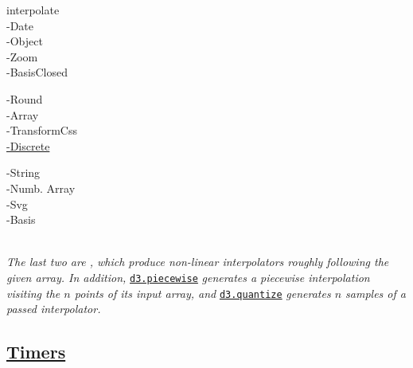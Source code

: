 {\footnotesize
\begin{minipage}[t]{2.0cm}
    interpolate\\
    -Date\\
    -Object\\
    -Zoom\\
    -BasisClosed
\end{minipage}
\begin{minipage}[t]{2.0cm}
    -Round\\
    -Array\\
    -TransformCss\\
    \href{https://observablehq.com/@d3/d3-interpolatediscrete}{-Discrete}
\end{minipage}
\begin{minipage}[t]{2.0cm}
    -String\\
    -Numb. Array\\
    -Svg\\
    -Basis
\end{minipage}
}\\
\textit{The last two are , which produce non-linear interpolators roughly following the given array. In addition, }\texttt{\href{https://observablehq.com/@d3/d3-piecewise}{d3.piecewise}}\textit{ generates a piecewise interpolation visiting the $n$ points of its input array, and }\href{https://observablehq.com/@d3/d3-quantize}{\texttt{d3.quantize}}\textit{ generates $n$ samples of a passed interpolator.}


\subsection*{\href{https://github.com/d3/d3-timer}{Timers}}


